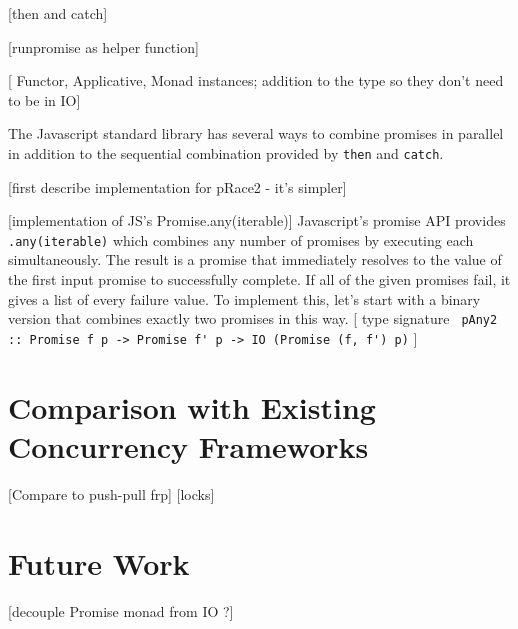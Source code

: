 \documentclass[sigplan,screen,review]{acmart}
\begin{document}
[then and catch]

[runpromise as helper function]

[ Functor, Applicative, Monad instances; addition to the type so they don't need to be in IO]

The Javascript standard library has several ways to combine promises in parallel in addition to the sequential combination provided by \lstinline{then} and \lstinline{catch}.

[first describe implementation for pRace2 - it's simpler]

[implementation of JS's Promise.any(iterable)] Javascript's promise API provides \lstinline{.any(iterable)} which combines any number of promises by executing each simultaneously.  The result is a promise that immediately resolves to the value of the first input promise to successfully complete.  If all of the given promises fail, it gives a list of every failure value.  To implement this, let's start with a binary version that combines exactly two promises in this way.  [ type signature \lstinline{ pAny2 :: Promise f p -> Promise f' p -> IO (Promise (f, f') p)} ]

\section{Comparison with Existing Concurrency Frameworks}
[Compare to push-pull frp]
[locks]

\section{Future Work}

[decouple Promise monad from IO ?]
\end{document}
